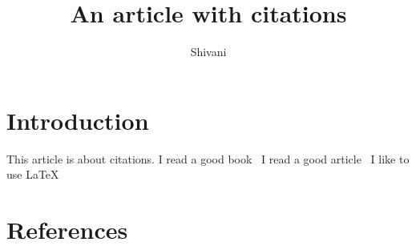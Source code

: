 \documentclass{article}
\title{An article with citations}
\author{Shivani}
\date{}
\begin{document}
\maketitle

\section{Introduction}

This article is about citations. I read a good book~\cite{smith2012}
I read a good article~\cite{hall2013}
I like to use LaTeX~\cite{latex}


\section{References}


\end{document}
